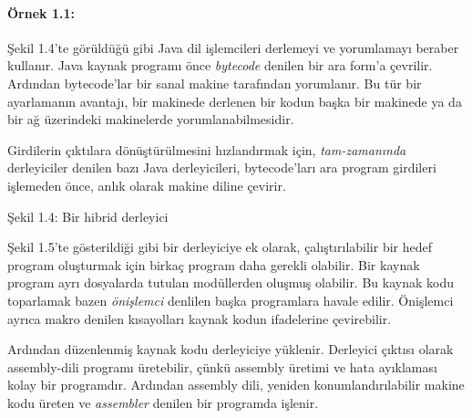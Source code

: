 \documentclass{book}
\begin{document}
\paragraph{Örnek 1.1:}
Şekil 1.4'te görüldüğü gibi Java dil işlemcileri derlemeyi ve yorumlamayı beraber kullanır. Java kaynak programı önce \textit{bytecode} denilen bir ara form'a çevrilir. Ardından bytecode'lar bir sanal makine tarafından yorumlanır. Bu tür bir ayarlamanın avantajı, bir makinede derlenen bir kodun başka bir makinede ya da bir ağ üzerindeki makinelerde yorumlanabilmesidir.

Girdilerin çıktılara dönüştürülmesini hızlandırmak için, \textit{tam-zamanında} derleyiciler denilen bazı Java derleyicileri, bytecode'ları ara program girdileri işlemeden önce,  anlık olarak makine diline çevirir. 

\begin{center}
\break

Şekil 1.4: Bir hibrid derleyici
\end{center}

Şekil 1.5'te gösterildiği gibi bir derleyiciye ek olarak, çalıştırılabilir bir hedef program oluşturmak için birkaç program daha gerekli olabilir. Bir kaynak program ayrı dosyalarda tutulan modüllerden oluşmuş olabilir. Bu kaynak kodu toparlamak bazen \textit{önişlemci} denlilen başka programlara havale edilir. Önişlemci ayrıca makro denilen kısayolları kaynak kodun ifadelerine çevirebilir.

Ardından düzenlenmiş kaynak kodu derleyiciye yüklenir. Derleyici çıktısı olarak assembly-dili programı üretebilir, çünkü assembly üretimi ve hata ayıklaması kolay bir programdır. Ardından assembly dili, yeniden konumlandırılabilir makine kodu üreten ve \textit{assembler} denilen bir programda işlenir.
\end{document}
